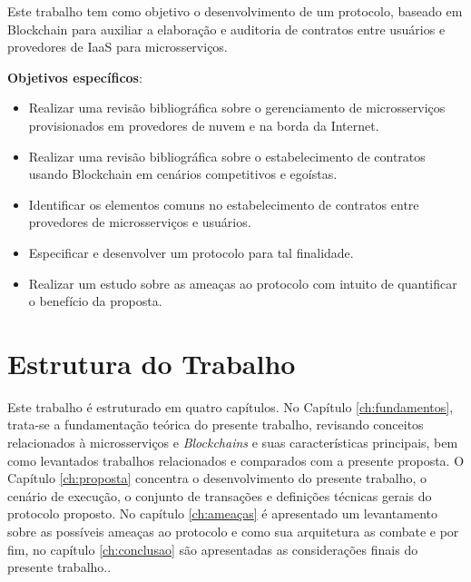 Este trabalho tem como objetivo o desenvolvimento de um protocolo, baseado em
Blockchain para auxiliar a elaboração e auditoria de contratos entre usuários e provedores de IaaS para microsserviços.

\vskip 0.5cm
\noindent\textbf{Objetivos específicos}: 
\begin{itemize}
    \item Realizar uma revisão bibliográfica sobre o gerenciamento de microsserviços provisionados em provedores de nuvem e na borda da Internet.
    \item Realizar uma revisão bibliográfica sobre o estabelecimento de contratos usando Blockchain em cenários competitivos e egoístas.
    \item Identificar os elementos comuns no estabelecimento de contratos entre provedores de microsserviços e usuários.
    \item Especificar e desenvolver um protocolo para tal finalidade.
    \item Realizar um estudo sobre as ameaças ao protocolo com intuito de quantificar o benefício da proposta.
\end{itemize}


\section{Estrutura do Trabalho}

Este trabalho é estruturado em quatro capítulos. No Capítulo \ref{ch:fundamentos}, trata-se a fundamentação teórica do presente trabalho, revisando conceitos relacionados à microsserviços e \textit{Blockchains} e suas características principais, bem como levantados trabalhos relacionados e comparados com a presente proposta. O Capítulo \ref{ch:proposta} concentra o desenvolvimento do presente trabalho, o cenário de execução, o conjunto de transações e definições técnicas gerais do protocolo proposto. No capítulo \ref{ch:ameaças} é apresentado um levantamento sobre as possíveis ameaças ao protocolo e como sua arquitetura as combate e por fim, no capítulo \ref{ch:conclusao} são apresentadas as considerações finais do presente trabalho..

